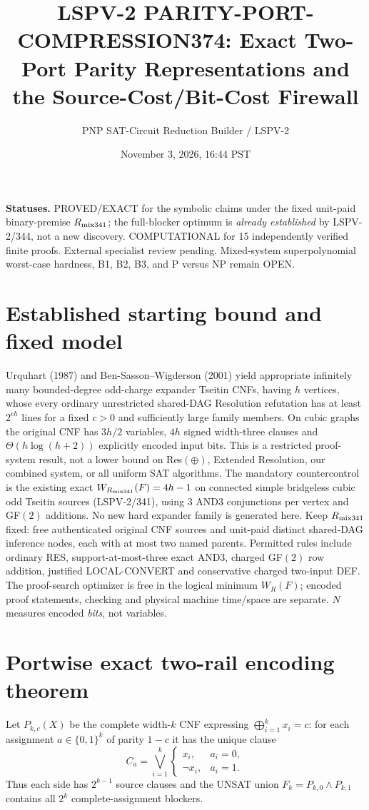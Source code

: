 \documentclass[11pt]{article}
\title{LSPV-2 PARITY-PORT-COMPRESSION374: Exact Two-Port Parity Representations and the Source-Cost/Bit-Cost Firewall}
\author{PNP SAT-Circuit Reduction Builder / LSPV-2}
\date{November 3, 2026, 16:44 PST}
\begin{document}
\maketitle
\noindent\textbf{Statuses.} PROVED/EXACT for the symbolic claims under the fixed unit-paid binary-premise $R_{\rm mix341}$; the full-blocker optimum is \emph{already established} by LSPV-2/344, not a new discovery. COMPUTATIONAL for 15 independently verified finite proofs. External specialist review pending. Mixed-system superpolynomial worst-case hardness, B1, B2, B3, and P versus NP remain OPEN.

\section*{Established starting bound and fixed model}
Urquhart (1987) and Ben-Sasson--Wigderson (2001) yield appropriate infinitely many bounded-degree odd-charge expander Tseitin CNFs, having $h$ vertices, whose every ordinary unrestricted shared-DAG Resolution refutation has at least $2^{ch}$ lines for a fixed $c>0$ and sufficiently large family members. On cubic graphs the original CNF has $3h/2$ variables, $4h$ signed width-three clauses and $\Theta(h\log(h+2))$ explicitly encoded input bits. This is a restricted proof-system result, not a lower bound on Res$(\oplus)$, Extended Resolution, our combined system, or all uniform SAT algorithms. The mandatory countercontrol is the existing exact $W_{R_{\rm mix341}}(F)=4h-1$ on connected simple bridgeless cubic odd Tseitin sources (LSPV-2/341), using 3 AND3 conjunctions per vertex and GF$(2)$ additions. No new hard expander family is generated here.
Keep $R_{\rm mix341}$ fixed: free authenticated original CNF sources and unit-paid distinct shared-DAG inference nodes, each with at most two named parents. Permitted rules include ordinary RES, support-at-most-three exact AND3, charged GF$(2)$ row addition, justified LOCAL-CONVERT and conservative charged two-input DEF. The proof-search optimizer is free in the logical minimum $W_R(F)$; encoded proof statements, checking and physical machine time/space are separate. $N$ measures encoded \emph{bits}, not variables.

\section*{Portwise exact two-rail encoding theorem}
Let $P_{k,c}(X)$ be the complete width-$k$ CNF expressing $\bigoplus_{i=1}^k x_i=c$: for each assignment $a\in\{0,1\}^k$ of parity $1-c$ it has the unique clause
\[
C_a=\bigvee_{i=1}^k\begin{cases}x_i,&a_i=0,\\ \neg x_i,&a_i=1.\end{cases}
\]
Thus each side has $2^{k-1}$ source clauses and the UNSAT union $F_k=P_{k,0}\wedge P_{k,1}$ contains all $2^k$ complete-assignment blockers.
\end{document}
